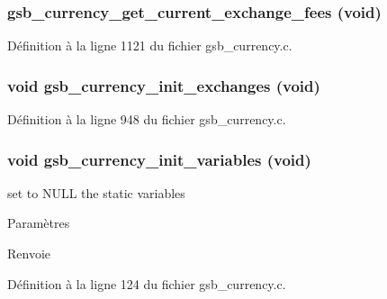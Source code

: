 \subsubsection[{gsb\_\-currency\_\-get\_\-current\_\-exchange\_\-fees}]{ gsb\_\-currency\_\-get\_\-current\_\-exchange\_\-fees (void)}\label{gsb__currency_8h_a1ec60f51d17f25c548d65ec10fa7498a}


Définition à la ligne 1121 du fichier gsb\_\-currency.c.

\subsubsection[{gsb\_\-currency\_\-init\_\-exchanges}]{\setlength{\rightskip}{0pt plus 5cm}void gsb\_\-currency\_\-init\_\-exchanges (void)}\label{gsb__currency_8h_a11418c2c043ae6df7915c8f71a5af31e}


Définition à la ligne 948 du fichier gsb\_\-currency.c.

\subsubsection[{gsb\_\-currency\_\-init\_\-variables}]{\setlength{\rightskip}{0pt plus 5cm}void gsb\_\-currency\_\-init\_\-variables (void)}\label{gsb__currency_8h_ad3d2955dc098538b6745184d1dd571f0}
set to NULL the static variables


\begin{DoxyParams}{Paramètres}
\item[{\em }]\end{DoxyParams}
\begin{DoxyReturn}{Renvoie}

\end{DoxyReturn}


Définition à la ligne 124 du fichier gsb\_\-currency.c.

